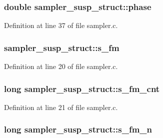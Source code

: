 \subsubsection[{\texorpdfstring{phase}{phase}}]{\setlength{\rightskip}{0pt plus 5cm}double sampler\+\_\+susp\+\_\+struct\+::phase}\hypertarget{structsampler__susp__struct_a7bca8a7973877b506eb106376e241331}{}\label{structsampler__susp__struct_a7bca8a7973877b506eb106376e241331}


Definition at line 37 of file sampler.\+c.

\subsubsection[{\texorpdfstring{s\+\_\+fm}{s_fm}}]{ sampler\+\_\+susp\+\_\+struct\+::s\+\_\+fm}\hypertarget{structsampler__susp__struct_a5a21012cb28238120a79ac00dfa2d852}{}\label{structsampler__susp__struct_a5a21012cb28238120a79ac00dfa2d852}


Definition at line 20 of file sampler.\+c.

\subsubsection[{\texorpdfstring{s\+\_\+fm\+\_\+cnt}{s_fm_cnt}}]{\setlength{\rightskip}{0pt plus 5cm}long sampler\+\_\+susp\+\_\+struct\+::s\+\_\+fm\+\_\+cnt}\hypertarget{structsampler__susp__struct_abb84e22a7cd583230925b73d91b421f6}{}\label{structsampler__susp__struct_abb84e22a7cd583230925b73d91b421f6}


Definition at line 21 of file sampler.\+c.

\subsubsection[{\texorpdfstring{s\+\_\+fm\+\_\+n}{s_fm_n}}]{\setlength{\rightskip}{0pt plus 5cm}long sampler\+\_\+susp\+\_\+struct\+::s\+\_\+fm\+\_\+n}\hypertarget{structsampler__susp__struct_a631e45b6911f900f9c3a4d1efc8805a2}{}\label{structsampler__susp__struct_a631e45b6911f900f9c3a4d1efc8805a2}


